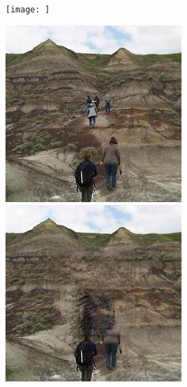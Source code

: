 \documentclass[a4paper, 11pt]{article}
\begin{document}
\begin{figure}
\begin{minipage}{.3\textwidth}
    \end{minipage}
    \begin{minipage}{.3\textwidth}
      \centering
      \texttt{[image: ]}
    \end{minipage}
\end{figure}

\begin{figure}
    \centering
    \begin{minipage}{.3\textwidth}
      \centering
      \includegraphics[width=.95\linewidth]{documentation/img/badlands.jpg}
    \end{minipage}%
    \begin{minipage}{.3\textwidth}
      \centering
      \includegraphics[width=.95\linewidth]{documentation/img/badlands_out_45k.png}

\end{minipage}
\end{figure}
\end{document}
